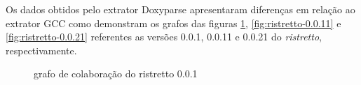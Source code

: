 Os dados obtidos pelo extrator Doxyparse apresentaram diferenças em relação ao
extrator GCC como demonstram os grafos das figuras \ref{fig:ristretto-0.0.1},
\ref{fig:ristretto-0.0.11} e \ref{fig:ristretto-0.0.21} referentes as versões 0.0.1,
0.0.11 e 0.0.21 do {\it ristretto}, respectivamente.

\begin{figure}
\center
{}
\qquad
{}
\caption{grafo de colaboração do ristretto 0.0.1}
\label{fig:ristretto-0.0.1}
\end{figure}

